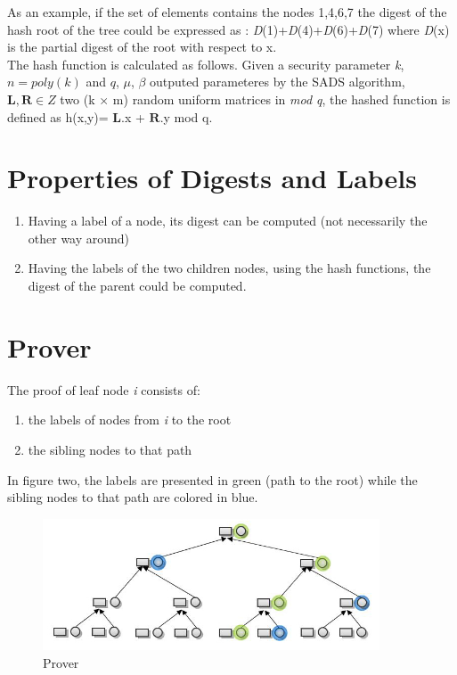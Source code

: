 \documentclass[11pt, letterpaper, oneside]{article}
\begin{document}
	
	As an example, if the set of elements contains the nodes {1,4,6,7} the digest of the hash root of the tree 
	could be expressed as : \textit{D}(1)+\textit{D}(4)+\textit{D}(6)+\textit{D}(7)
        where \textit{D}(x) is the partial digest of the root with respect to x. \\
	
	The hash function is calculated as follows. Given a security parameter \textit{k}, $\textit{n} = 
	poly(\textit{k})$ and $\textit{q} $, $\textit{$\mu$}$, $\textit{$\beta$}$ outputed parameteres by the SADS 
	algorithm, $\textbf{L}, \textbf{R} \in Z $ two (k $\times$ m) random uniform matrices in \textit{mod q}, the 
	hashed function is defined as h(x,y)= $\textbf{L}$.x + $\textbf{R}$.y mod q. \\ 
	
	\section{Properties of Digests and Labels}
	
	\begin{enumerate}
	\item Having a label of a node, its digest can be computed (not necessarily the other way around)
	\item Having the labels of the two children nodes, using the hash functions, the digest of the parent
	      could be computed.
	\end{enumerate}
	
	\section{Prover}
	
	The proof of leaf node \textit{i} consists of: 
	\begin{enumerate}
	 \item the labels of nodes from \textit{i} to the root
	 \item the sibling nodes to that path
	\end{enumerate}
	
	In figure two, the labels are presented in green (path to the root) while the sibling
	nodes to that path are colored in blue. 

	\begin{figure}[h]
        \centering
        \includegraphics[width=100mm]{./pic/8.jpg}
        \caption[]{Prover}
        \end{figure}
	
\end{document}
